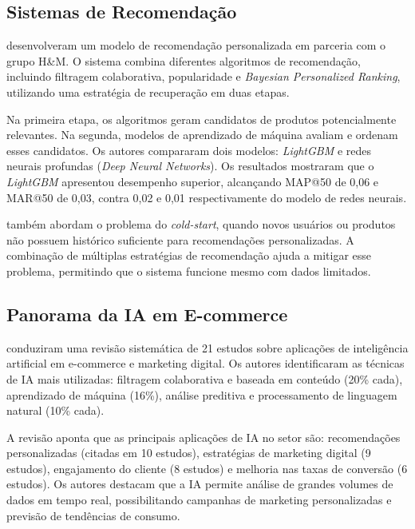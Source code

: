 \subsection{Sistemas de Recomendação}

\cite{nguyen_personalized_2024} desenvolveram um modelo de recomendação personalizada em parceria com o grupo H\&M. O sistema combina diferentes algoritmos de recomendação, incluindo filtragem colaborativa, popularidade e \textit{Bayesian Personalized Ranking}, utilizando uma estratégia de recuperação em duas etapas.

Na primeira etapa, os algoritmos geram candidatos de produtos potencialmente relevantes. Na segunda, modelos de aprendizado de máquina avaliam e ordenam esses candidatos. Os autores compararam dois modelos: \textit{LightGBM} e redes neurais profundas (\textit{Deep Neural Networks}). Os resultados mostraram que o \textit{LightGBM} apresentou desempenho superior, alcançando MAP@50 de 0,06 e MAR@50 de 0,03, contra 0,02 e 0,01 respectivamente do modelo de redes neurais.

\cite{nguyen_personalized_2024} também abordam o problema do \textit{cold-start}, quando novos usuários ou produtos não possuem histórico suficiente para recomendações personalizadas. A combinação de múltiplas estratégias de recomendação ajuda a mitigar esse problema, permitindo que o sistema funcione mesmo com dados limitados.

\subsection{Panorama da IA em E-commerce}

\cite{saleh_artificial_2025} conduziram uma revisão sistemática de 21 estudos sobre aplicações de inteligência artificial em e-commerce e marketing digital. Os autores identificaram as técnicas de IA mais utilizadas: filtragem colaborativa e baseada em conteúdo (20\% cada), aprendizado de máquina (16\%), análise preditiva e processamento de linguagem natural (10\% cada).

A revisão aponta que as principais aplicações de IA no setor são: recomendações personalizadas (citadas em 10 estudos), estratégias de marketing digital (9 estudos), engajamento do cliente (8 estudos) e melhoria nas taxas de conversão (6 estudos). Os autores destacam que a IA permite análise de grandes volumes de dados em tempo real, possibilitando campanhas de marketing personalizadas e previsão de tendências de consumo.

